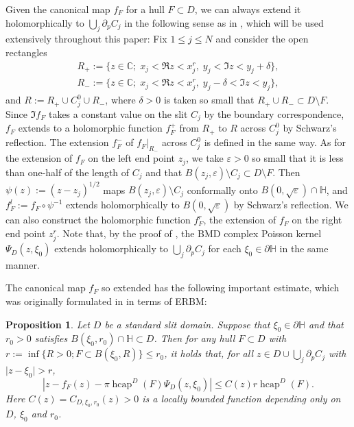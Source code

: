 \documentclass[preprint,12pt]{elsarticle}
\newtheorem{prop}[thm]{Proposition}
\theoremstyle{definition}
\newcommand{\C}{\mathbb{C}}
\newcommand{\uhp}{\mathbb{H}}
\DeclareMathOperator{\hcap}{hcap}
\begin{document}
Given the canonical map $f_F$ for a hull $F \subset D$,
we can always extend it holomorphically to $\bigcup_j \partial_p C_j$
in the following sense as in \cite[Section~2]{CF18},
which will be used extensively throughout this paper:
Fix $1 \leq j \leq N$ and consider the open rectangles
\begin{gather*}
R_+:=\{z \in \C ;\; x_j < \Re z < x^r_j,\; y_j < \Im z <y_j + \delta\}, \\
R_-:=\{z \in \C ;\; x_j < \Re z < x^r_j,\; y_j - \delta < \Im z <y_j\},
\end{gather*}
and $R:=R_+ \cup C^0_j \cup R_-$,
where $\delta>0$ is taken so small that $R_+ \cup R_- \subset D \setminus F$.
Since $\Im f_F$ takes a constant value on the slit $C_j$
by the boundary correspondence, $f_F$ extends to a holomorphic function $f_F^+$
from $R_+$ to $R$ across $C^0_j$ by Schwarz's reflection.
The extension $f_F^-$ of $f_F|_{R_-}$ across $C^0_j$ is defined in the same way.
As for the extension of $f_F$ on the left end point $z_j$,
we take $\varepsilon>0$ so small that it is less than one-half of the length of $C_j$
and that $B(z_j, \varepsilon) \setminus C_j \subset D \setminus F$.
Then $\psi(z):=(z-z_j)^{1/2}$ maps $B(z_j, \varepsilon) \setminus C_j$
conformally onto $B(0, \sqrt{\varepsilon}) \cap \uhp$, and
$f^l_F:=f_F \circ \psi^{-1}$ extends holomorphically to $B(0, \sqrt{\varepsilon})$
by Schwarz's reflection.
We can also construct the holomorphic function $f^r_F$,
the extension of $f_F$ on the right end point $z^r_j$.
Note that, by the proof of \cite[Lemma~6.1]{CFR16},
the BMD complex Poisson kernel $\Psi_D(z, \xi_0)$
extends holomorphically to $\bigcup_j \partial_p C_j$ 
for each $\xi_0 \in \partial \uhp$ in the same manner.

The canonical map $f_F$ so extended has the following important estimate,
which was originally formulated in \cite[Proposition~6.12]{Dr11} in terms of ERBM:

\begin{prop} \label{prop:2ndorder}
Let $D$ be a standard slit domain.
Suppose that $\xi_0 \in \partial \uhp$ and that
$r_0>0$ satisfies $B(\xi_0, r_0) \cap \uhp \subset D$.
Then for any hull $F \subset D$ with $r:=\inf\{R>0; F \subset B(\xi_0,R)\} \leq r_0$,
it holds that, for all $z \in D \cup \bigcup_j \partial_p C_j$
with $\lvert z-\xi_0 \rvert>r$,
\begin{equation} \label{eq:2ndorder}
\left\lvert z-f_F(z)-\pi\hcap^D(F)\Psi_D(z,\xi_0) \right\rvert \leq C(z)r\hcap^D(F).
\end{equation}
Here $C(z)=C_{D,\xi_0,r_0}(z)>0$ is a locally bounded function depending
only on $D$, $\xi_0$ and $r_0$.
\end{prop}
\end{document}
